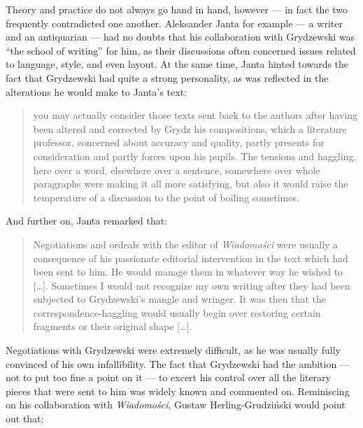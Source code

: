 \begin{paper}
\noindent Theory and practice do not always go hand in hand, however --- in fact
the two frequently contradicted one another. Aleksander Janta for example --- a writer and
an antiquarian --- had no doubts that his collaboration
with Grydzewski was ``the school of writing'' for him, as their discussions
often concerned issues related to language, style, and even layout. At the same time, Janta hinted towards the fact that Grydzewski had quite a strong personality, as was reflected in the alterations he
would make to Janta's text: 

\begin{quote}
you may actually consider those texts sent back to the
authors after having been altered and corrected by Grydz his
compositions, which a literature professor, concerned about accuracy and
quality, partly presents for consideration and partly forces upon his
pupils. The tensions and haggling, here over a word, elsewhere over a
sentence, somewhere over whole paragraphs were making it all more
satisfying, but also it would raise the temperature of a discussion to
the point of boiling sometimes.
\begin{flushright}
\citep[177]{janta_lustra_1982}
\end{flushright}
\end{quote}

\noindent And further on, Janta remarked that:

\begin{quote}
Negotiations and ordeals with the editor of \emph{Wiadomości} were
usually a consequence of his passionate editorial intervention in the
text which had been sent to him. He would manage them in whatever way he
wished to {[}\ldots{}{]}. Sometimes I would not recognize my own writing
after they had been subjected to Grydzewski's mangle and wringer. It was
then that the correspondence-haggling would usually begin over restoring
certain fragments or their original shape {[}\ldots{}{]}.
\begin{flushright}
\citep[199]{janta_lustra_1982}
\end{flushright}
\end{quote}

\noindent Negotiations with Grydzewski were extremely difficult, as he was usually
fully convinced of his own infallibility. The fact that Grydzewski had the
ambition --- not to put too fine a point on it --- to excert his control over all the literary pieces that were
sent to him was widely known and commented on. Reminiscing on his collaboration with
\emph{Wiadomości}, Gustaw
Herling-Grudziński  would point out that:


\end{paper}
